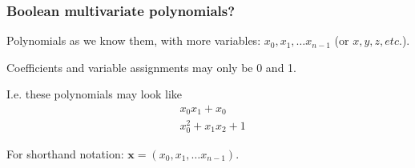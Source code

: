 \documentclass{beamer}
\begin{document}







\begin{frame}
    \frametitle{Boolean multivariate polynomials?}
    Polynomials as we know them, with more variables: $x_0, x_1, \dots x_{n - 1}$ (or $x, y, z, etc.$).

    \pause 
    
    Coefficients and variable assignments may only be 0 and 1.

    \pause 

    I.e. these polynomials may look like 
    \begin{equation*}
        \begin{split}
            &x_0x_1 + x_0\\
            &x_0^2 + x_1x_2 + 1
        \end{split}
    \end{equation*}

    \pause

    For shorthand notation: $\mathbf{x} = (x_0, x_1, \dots x_{n - 1})$.

\end{frame}
\end{document}
